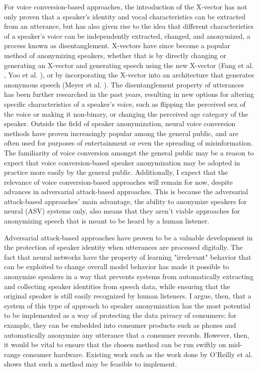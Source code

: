 \documentclass{Interspeech2024}
\begin{document}
For voice conversion-based approaches, the introduction of the X-vector has not only proven that a speaker's identity and vocal characteristics can be extracted from an utterance, but has also given rise to the idea that different characteristics of a speaker's voice can be independently extracted, changed, and anonymized, a process known as disentanglement.
X-vectors have since become a popular method of anonymizing speakers, whether that is by directly changing or generating an X-vector and generating speech using the new X-vector (Fang et al. \cite{fang_2019_xvector}, Yoo et al. \cite{yoo_2020_voice_conversion}), or by incorporating the X-vector into an architecture that generates anonymous speech (Meyer et al. \cite{meyer_2023_adversarial_gan}).
The disentanglement property of utterances has been further researched in the past years, resulting in new options for altering specific characteristics of a speaker's voice, such as flipping the perceived sex of the voice or making it non-binary, or changing the perceived age category of the speaker.
Outside the field of speaker anonymization, neural voice conversion methods have proven increasingly popular among the general public, and are often used for purposes of entertainment or even the spreading of misinformation.
The familiarity of voice conversion amongst the general public may be a reason to expect that voice conversion-based speaker anonymization may be adopted in practice more easily by the general public.
Additionally, I expect that the relevance of voice conversion-based approaches will remain for now, despite advances in adversarial attack-based approaches.
This is because the adversarial attack-based approaches' main advantage, the ability to anonymize speakers for neural (ASV) systems only, also means that they aren't viable approaches for anonymizing speech that is meant to be heard by a human listener.

Adversarial attack-based approaches have proven to be a valuable development in the protection of speaker identity when utterances are processed digitally.
The fact that neural networks have the property of learning "irrelevant" behavior that can be exploited to change overall model behavior has made it possible to anonymize speakers in a way that prevents systems from automatically extracting and collecting speaker identities from speech data, while ensuring that the original speaker is still easily recognized by human listeners.
I argue, then, that a system of this type of approach to speaker anonymization has the most potential to be implemented as a way of protecting the data privacy of consumers: for example, they can be embedded into consumer products such as phones and automatically anonymize any utterance that a consumer records.
However, then, it would be vital to ensure that the chosen method can be run swiftly on mid-range consumer hardware.
Existing work such as the work done by O'Reilly et al. \cite{oreilly_2022_voiceblock} shows that such a method may be feasible to implement.
\end{document}
